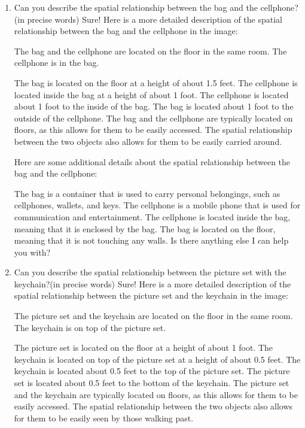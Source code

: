 \begin{enumerate}
    \item Can you describe the spatial relationship between the bag and the cellphone?(in precise words)
    \subitem Sure! Here is a more detailed description of the spatial relationship between the bag and the cellphone in the image:

    The bag and the cellphone are located on the floor in the same room. The cellphone is in the bag.
    
    The bag is located on the floor at a height of about 1.5 feet.
    The cellphone is located inside the bag at a height of about 1 foot.
    The cellphone is located about 1 foot to the inside of the bag.
    The bag is located about 1 foot to the outside of the cellphone.
    The bag and the cellphone are typically located on floors, as this allows for them to be easily accessed. The spatial relationship between the two objects also allows for them to be easily carried around.
    
    Here are some additional details about the spatial relationship between the bag and the cellphone:
    
    The bag is a container that is used to carry personal belongings, such as cellphones, wallets, and keys.
    The cellphone is a mobile phone that is used for communication and entertainment.
    The cellphone is located inside the bag, meaning that it is enclosed by the bag.
    The bag is located on the floor, meaning that it is not touching any walls.
    Is there anything else I can help you with?
    \item Can you describe the spatial relationship between the picture set with the keychain?(in precise words)
    \subitem Sure! Here is a more detailed description of the spatial relationship between the picture set and the keychain in the image:

    The picture set and the keychain are located on the floor in the same room. The keychain is on top of the picture set.
    
    The picture set is located on the floor at a height of about 1 foot.
    The keychain is located on top of the picture set at a height of about 0.5 feet.
    The keychain is located about 0.5 feet to the top of the picture set.
    The picture set is located about 0.5 feet to the bottom of the keychain.
    The picture set and the keychain are typically located on floors, as this allows for them to be easily accessed. The spatial relationship between the two objects also allows for them to be easily seen by those walking past.
    

\end{enumerate}
